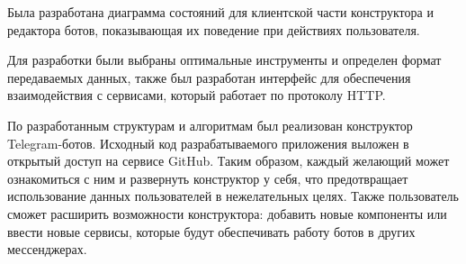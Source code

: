 Была разработана диаграмма состояний для клиентской части
конструктора и редактора ботов, показывающая их поведение при действиях
пользователя.

Для разработки были выбраны оптимальные инструменты и определен
формат передаваемых данных, также был разработан интерфейс для обеспечения
взаимодействия с сервисами, который работает по протоколу HTTP.

По разработанным структурам и алгоритмам был реализован конструктор Telegram-ботов.
Исходный код разрабатываемого приложения выложен в открытый доступ на сервисе GitHub.
Таким образом, каждый желающий может ознакомиться с ним и развернуть конструктор
у себя, что предотвращает использование данных пользователей в нежелательных целях.
Также пользователь сможет расширить возможности конструктора: добавить новые компоненты
или ввести новые сервисы, которые будут обеспечивать работу ботов в других мессенджерах.


